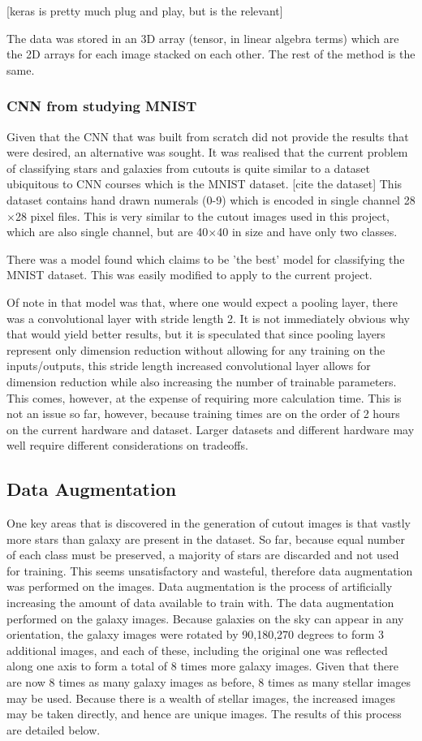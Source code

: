 \documentclass[a4paper,fleqn,usenatbib]{mnras}
\begin{document}
[keras is pretty much plug and play, but is the relevant]

The data was stored in an 3D array (tensor, in linear algebra terms) which are the 2D arrays for each image stacked on each other. The rest of the method is the same. 
\subsubsection{CNN from studying MNIST}
Given that the CNN that was built from scratch did not provide the results that were desired, an alternative was sought. It was realised that the current problem of classifying stars and galaxies from cutouts is quite similar to a dataset ubiquitous to CNN courses which is the MNIST dataset. [cite the dataset] This dataset contains hand drawn numerals (0-9) which is encoded in single channel 28$\times$28 pixel files. This is very similar to the cutout images used in this project, which are also single channel, but are 40$\times$40 in size and have only two classes. 

There was a model found which claims to be 'the best' model for classifying the MNIST dataset. This was easily modified to apply to the current project. 

Of note in that model was that, where one would expect a pooling layer, there was a convolutional layer with stride length 2. It is not immediately obvious why that would yield better results, but it is speculated that since pooling layers represent only dimension reduction without allowing for any training on the inputs/outputs, this stride length increased convolutional layer allows for dimension reduction while also increasing the number of trainable parameters. This comes, however, at the expense of requiring more calculation time. This is not an issue so far, however, because training times are on the order of 2 hours on the current hardware and dataset. Larger datasets and different hardware may well require different considerations on tradeoffs. 

\subsection{Data Augmentation}
One key areas that is discovered in the generation of cutout images is that vastly more stars than galaxy are present in the dataset. So far, because equal number of each class must be preserved, a majority of stars are discarded and not used for training. This seems unsatisfactory and wasteful, therefore data augmentation was performed on the images. Data augmentation is the process of artificially increasing the amount of data available to train with. The data augmentation performed on the galaxy images. Because galaxies on the sky can appear in any orientation, the galaxy images were rotated by 90,180,270 degrees to form 3 additional images, and each of these, including the original one was reflected along one axis to form a total of 8 times more galaxy images. Given that there are now 8 times as many galaxy images as before, 8 times as many stellar images may be used. Because there is a wealth of stellar images, the increased images may be taken directly, and hence are unique images. The results of this process are detailed below.
\end{document}
